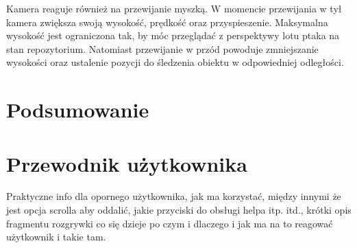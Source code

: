 \documentclass[11pt,a4paper,polish,thesis]{dcsbook}
\begin{document}
Kamera reaguje również na przewijanie myszką. W momencie przewijania w tył kamera zwiększa swoją wysokość, prędkość oraz przyspieszenie. Maksymalna wysokość jest ograniczona tak, by móc przeglądać z perspektywy lotu ptaka na stan repozytorium. Natomiast przewijanie w przód powoduje zmniejszanie wysokości oraz ustalenie pozycji do śledzenia obiektu w odpowiedniej odległości. 	
	
	\chapter{Podsumowanie}
	
	\appendix
	
	\chapter{Przewodnik użytkownika}
	
	Praktyczne info dla opornego użytkownika, jak ma korzystać, między innymi że jest opcja scrolla aby oddalić, jakie przyciski do obsługi helpa itp. itd., krótki opis fragmentu rozgrywki co się dzieje po czym i dlaczego i jak ma na to reagować użytkownik i takie tam.
	
	\backmatter
	
\end{document}
